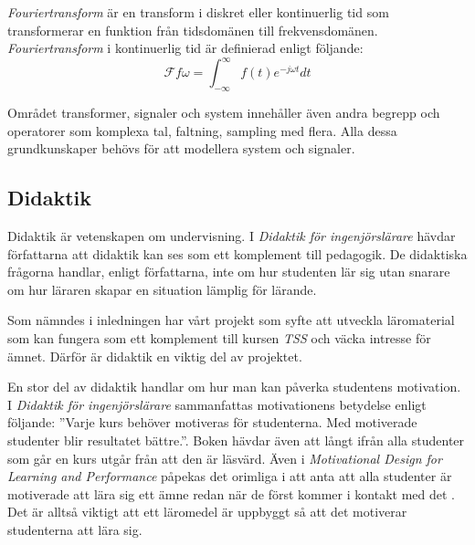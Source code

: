 \documentclass[12pt,a4paper,twoside,openright]{article}
\begin{document}
\textit{Fouriertransform} är en transform i diskret eller kontinuerlig
tid som transformerar en funktion från tidsdomänen till
frekvensdomänen. \textit{Fouriertransform} i kontinuerlig tid är
definierad enligt följande:
\[\mathcal{F} f \omega = \int_{-\infty}^{\infty} f(t) e^{-j \omega t} dt\]






Området transformer, signaler och system innehåller även andra begrepp
och operatorer som komplexa tal, faltning, sampling med flera. Alla
dessa grundkunskaper behövs för att modellera system och signaler.

\subsection{Didaktik}
\label{sec:didaktik}
Didaktik är vetenskapen om undervisning. I \textit{Didaktik för
  ingenjörslärare}\cite{didaktik_for_ingenjorslarare} hävdar
författarna att didaktik kan ses som ett komplement till pedagogik. De
didaktiska frågorna handlar, enligt författarna, inte om hur studenten
lär sig utan snarare om hur läraren skapar en situation lämplig för
lärande.

Som nämndes i inledningen har vårt projekt som syfte att utveckla
läromaterial som kan fungera som ett komplement till kursen
\textit{TSS} och väcka intresse för ämnet.  Därför är didaktik en
viktig del av projektet.

En stor del av didaktik handlar om hur man kan påverka studentens
motivation. I \textit{Didaktik för ingenjörslärare} sammanfattas
motivationens betydelse enligt följande: ”Varje kurs behöver motiveras
för studenterna. Med motiverade studenter blir resultatet bättre.”.
Boken hävdar även att långt ifrån alla studenter som går en kurs utgår
från att den är läsvärd. Även i \textit{Motivational Design for
  Learning and Performance} påpekas det orimliga i att anta att alla
studenter är motiverade att lära sig ett ämne redan när de först
kommer i kontakt med det \cite{motivational_design}. Det är alltså
viktigt att ett läromedel är uppbyggt så att det motiverar studenterna
att lära sig.
\end{document}
